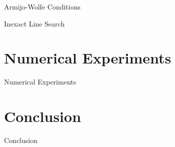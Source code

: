 \documentclass{beamer}
\begin{document}
\begin{frame}{Armijo-Wolfe Conditions}
\end{frame}

\begin{frame}{Inexact Line Search}
\end{frame}

\section{Numerical Experiments}
\begin{frame}{Numerical Experiments}
\end{frame}

\section{Conclusion}
\begin{frame}{Conclusion}
\end{frame}
\end{document}
